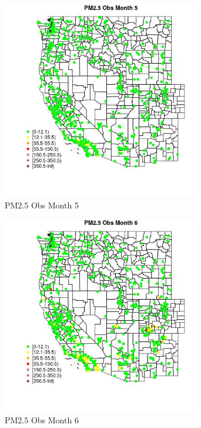 \begin{figure} 
\centering  
\includegraphics[width=0.77\textwidth]{Code_Outputs/Report_ML_input_PM25_Step4_part_f_de_duplicated_aves_prioritize_24hr_obswNAs_MapObsMo5PM25_Obs.jpg} 
\caption{\label{fig:Report_ML_input_PM25_Step4_part_f_de_duplicated_aves_prioritize_24hr_obswNAsMapObsMo5PM25_Obs}PM2.5 Obs Month 5} 
\end{figure} 
 

\begin{figure} 
\centering  
\includegraphics[width=0.77\textwidth]{Code_Outputs/Report_ML_input_PM25_Step4_part_f_de_duplicated_aves_prioritize_24hr_obswNAs_MapObsMo6PM25_Obs.jpg} 
\caption{\label{fig:Report_ML_input_PM25_Step4_part_f_de_duplicated_aves_prioritize_24hr_obswNAsMapObsMo6PM25_Obs}PM2.5 Obs Month 6} 
\end{figure} 
 

